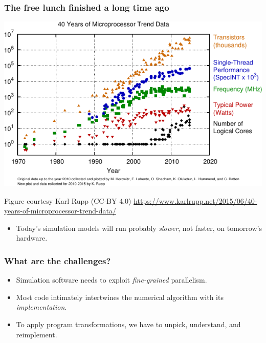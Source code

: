 \documentclass[presentation]{beamer}
\begin{document}
\begin{frame}
  \frametitle{The free lunch finished a long time ago}
    \begin{center}
      \includegraphics[height=0.6\textheight]{processor-trends}
    \end{center}
    \vspace{-2em}
    \begin{flushright}
      {\tiny Figure courtesy Karl Rupp (CC-BY 4.0) \url{https://www.karlrupp.net/2015/06/40-years-of-microprocessor-trend-data/}}
    \end{flushright}
  \begin{itemize}
  \item Today's simulation models will run probably \emph{slower}, not faster, on
    tomorrow's hardware.
  \end{itemize}
\end{frame}

\begin{frame}
  \frametitle{What are the challenges?}
  \begin{itemize}
  \item Simulation software needs to exploit \emph{fine-grained}
    parallelism.
  \item Most code intimately intertwines the numerical algorithm with
    its \emph{implementation}.
  \item To apply program transformations, we have to unpick,
    understand, and reimplement.
  \end{itemize}
\end{frame}
\end{document}
